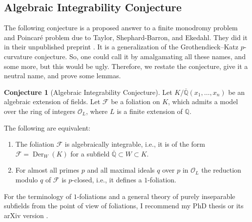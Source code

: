 \documentclass{amsart}
\newcommand{\cO}{\mathcal{O}}
\newcommand{\F}{\mathcal{F}}
\newcommand{\op}{\operatorname}
\theoremstyle{definition}
\newtheorem{conj}[thm]{Conjecture}
\begin{document}
\subsection{Algebraic Integrability Conjecture}

The following conjecture is a proposed answer to a finite monodromy problem and Poincaré problem due to Taylor, Shephard-Barron, and Ekedahl. They did it in their unpublished preprint \cite[Conjecture F]{TShBE-conjectureF}. It is a generalization of the Grothendieck--Katz $p$-curvature conjecture. So, one could call it by amalgamating all these names, and some more, but this would be ugly. Therefore, we restate the conjecture, give it a neutral name, and prove some lemmas.

\begin{conj}[Algebraic Integrability Conjecture]\label{conj: alg int conj}
    Let $K/\overline{\mathbb{Q}}(x_1,\ldots,x_n)$ be an algebraic extension of fields. Let $\F$ be a foliation on $K$, which admits a model over the ring of integers $\cO_L$, where $L$ is a finite extension of $\mathbb{Q}$.

    The following are equivalent:
    \begin{enumerate}
        \item The foliation $\F$ is algebraically integrable, i.e., it is of the form $\F=\op{Der}_{W}(K)$ for a subfield $\overline{\mathbb{Q}}\subset W\subset K$.
        \item For almost all primes $p$ and all maximal ideals $q$ over $p$ in $\cO_L$ the reduction modulo $q$ of $\F$ is $p$-closed, i.e., it defines a $1$-foliation.
    \end{enumerate}
\end{conj}

For the terminology of $1$-foliations and a general theory of purely inseparable subfields from the point of view of foliations, I recommend my PhD thesis \cite{Grabowski_PhD_thesis} or its arXiv version \cite{grabowski2025powertowerspurelyinseparable}.
\end{document}
